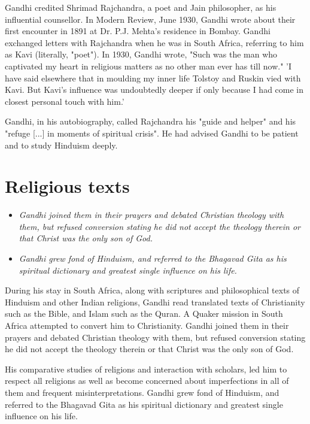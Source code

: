 Gandhi credited Shrimad Rajchandra, a poet and Jain philosopher, as his
influential counsellor. In Modern Review, June 1930, Gandhi wrote about
their first encounter in 1891 at Dr. P.J. Mehta's residence in Bombay.
Gandhi exchanged letters with Rajchandra when he was in South Africa,
referring to him as Kavi (literally, "poet"). In 1930, Gandhi wrote,
"Such was the man who captivated my heart in religious matters as no
other man ever has till now." 'I have said elsewhere that in moulding my
inner life Tolstoy and Ruskin vied with Kavi. But Kavi's influence was
undoubtedly deeper if only because I had come in closest personal touch
with him.'

Gandhi, in his autobiography, called Rajchandra his "guide and helper"
and his "refuge {[}...{]} in moments of spiritual crisis". He had
advised Gandhi to be patient and to study Hinduism deeply.

\section{Religious texts}\label{religious-texts}

\begin{itemize}
\item
  \emph{Gandhi joined them in their prayers and debated Christian
  theology with them, but refused conversion stating he did not accept
  the theology therein or that Christ was the only son of God.}
\item
  \emph{Gandhi grew fond of Hinduism, and referred to the Bhagavad Gita
  as his spiritual dictionary and greatest single influence on his
  life.}
\end{itemize}

During his stay in South Africa, along with scriptures and philosophical
texts of Hinduism and other Indian religions, Gandhi read translated
texts of Christianity such as the Bible, and Islam such as the Quran. A
Quaker mission in South Africa attempted to convert him to Christianity.
Gandhi joined them in their prayers and debated Christian theology with
them, but refused conversion stating he did not accept the theology
therein or that Christ was the only son of God.

His comparative studies of religions and interaction with scholars, led
him to respect all religions as well as become concerned about
imperfections in all of them and frequent misinterpretations. Gandhi
grew fond of Hinduism, and referred to the Bhagavad Gita as his
spiritual dictionary and greatest single influence on his life.

